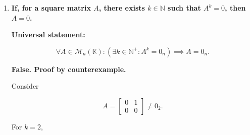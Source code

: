 \begin{enumerate}[label=\alph*)]
\begin{answer}
    Then,

    $$
    AB=\begin{bmatrix}
        1 & 0 \\
        0 & 0
    \end{bmatrix}
    =AC,
    $$

    while $B\neq C$.

    Therefore, the statement is false.

    \par\bigskip
    \noindent\textbf{Sufficient condition:}

    If $A$ is invertible, there exists
    $A^{-1}\in\mathcal{M}_n(\mathbb{K})$
    such that

    $$
    A^{-1}A=AA^{-1}=I_n.
    $$

    Multiplying both sides of $AB=AC$
    by $A^{-1}$ on the left:

    $$
    \begin{aligned}
        AB=AC
        &\implies A^{-1}(AB)=A^{-1}(AC) \\
        &\implies (A^{-1}A)B=(A^{-1}A)C \\
        &\implies I_nB=I_nC \\
        &\implies \boxed{B=C}.
    \end{aligned}
    $$

    Hence,

    $$
    \boxed{
        A\text{ invertible}
        \land AB=AC
        \implies B=C.
    }
    $$
\end{answer}


\item {\bfseries\boldmath
    If, for a square matrix $A$, there exists
    $k\in\mathbb{N}$ such that $A^k=0$,
    then $A=0$.
}

\begin{answer}
    \textbf{Universal statement:}

    $$
    \forall A\in\mathcal{M}_n(\mathbb{K}):
    \left(
        \exists k\in\mathbb{N}^+:
        A^k=0_n
    \right)
    \implies A=0_n.
    $$

    \textbf{False. Proof by counterexample.}

    Consider

    $$
    A=\begin{bmatrix}
        0 & 1 \\
        0 & 0
    \end{bmatrix}
    \neq0_2.
    $$

    For $k=2$,


\end{answer}
\end{enumerate}
